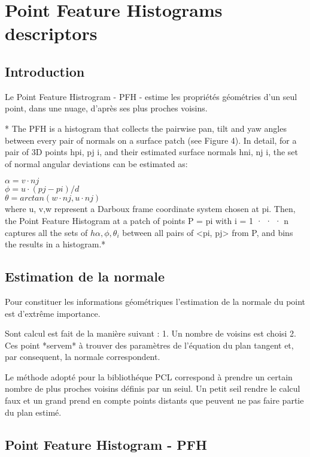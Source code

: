 \section{Point Feature Histograms descriptors}

\subsection{Introduction}

Le Point Feature Histrogram - PFH - estime les propriétés géométries d'un seul point, dans une nuage, d'après ses plus proches voisins. 

*
The PFH is a histogram that collects the pairwise pan, tilt and
yaw angles between every pair of normals on a surface patch
(see Figure 4). In detail, for a pair of 3D points hpi, pj
i, and their estimated surface normals hni, nj i, the set of normal
angular deviations can be estimated as:

$ \alpha = v · nj $ \\
$ \phi = u ·(pj − pi)/d $ \\
$ \theta = arctan(w · nj , u · nj ) $ \\

where u, v,w represent a Darboux frame coordinate system
chosen at pi. Then, the Point Feature Histogram at a patch
of points P = {pi} with i = {1 · · · n} captures all the sets
of $ hα, \phi, \theta_i $ between all pairs of <pi, pj> from P, and bins
the results in a histogram.*


\subsection{Estimation de la normale}

Pour constituer les informations géométriques l'estimation de la normale du point est d'extrême importance. 

Sont calcul est fait de la manière suivant :
1. Un nombre de voisins est choisi 
2. Ces point *servem* à trouver des paramètres de l'équation du plan tangent et, par consequent, la normale correspondent.

Le méthode adopté pour la bibliothéque PCL correspond à prendre un certain nombre de plus proches voisins définis par un seiul. Un petit seil rendre le calcul faux et un grand prend en compte points distants que peuvent ne pas faire partie du plan estimé.

\subsection{Point Feature Histogram - PFH}

